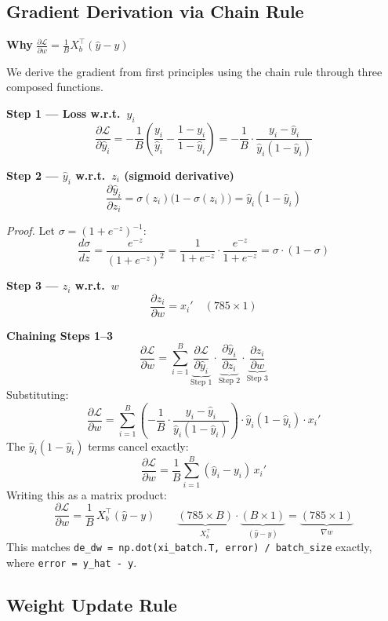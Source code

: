 \documentclass[11pt,a4paper]{article}
\begin{document}
\subsection{Gradient Derivation via Chain Rule}
\textbf{Why} $\displaystyle\frac{\partial \mathcal{L}}{\partial w} = \frac{1}{B} X_b^\top (\hat{y} - y)$

We derive the gradient from first principles using the chain rule through three composed functions.

\noindent\textbf{Step 1 — Loss w.r.t.\ $\hat{y}_i$}
\[
\frac{\partial \mathcal{L}}{\partial \hat{y}_i}
= -\frac{1}{B}\left(\frac{y_i}{\hat{y}_i} - \frac{1-y_i}{1-\hat{y}_i}\right)
= -\frac{1}{B} \cdot \frac{y_i - \hat{y}_i}{\hat{y}_i(1-\hat{y}_i)}
\]

\noindent\textbf{Step 2 — $\hat{y}_i$ w.r.t.\ $z_i$ (sigmoid derivative)}
\[
\frac{\partial \hat{y}_i}{\partial z_i} = \sigma(z_i)\bigl(1 - \sigma(z_i)\bigr) = \hat{y}_i(1 - \hat{y}_i)
\]

\textit{Proof.} Let $\sigma = (1+e^{-z})^{-1}$:
\[
\frac{d\sigma}{dz}
= \frac{e^{-z}}{(1+e^{-z})^2}
= \frac{1}{1+e^{-z}} \cdot \frac{e^{-z}}{1+e^{-z}}
= \sigma \cdot (1 - \sigma)
\]

\noindent\textbf{Step 3 — $z_i$ w.r.t.\ $w$}
\[
\frac{\partial z_i}{\partial w} = x_i' \quad (785 \times 1)
\]

\noindent\textbf{Chaining Steps 1--3}
\[
\frac{\partial \mathcal{L}}{\partial w}
= \sum_{i=1}^{B}
\underbrace{\frac{\partial \mathcal{L}}{\partial \hat{y}_i}}_{\text{Step 1}}
\cdot
\underbrace{\frac{\partial \hat{y}_i}{\partial z_i}}_{\text{Step 2}}
\cdot
\underbrace{\frac{\partial z_i}{\partial w}}_{\text{Step 3}}
\]
Substituting:
\[
\frac{\partial \mathcal{L}}{\partial w}
= \sum_{i=1}^{B}
\left(-\frac{1}{B} \cdot \frac{y_i - \hat{y}_i}{\hat{y}_i(1-\hat{y}_i)}\right)
\cdot \hat{y}_i(1-\hat{y}_i) \cdot x_i'
\]
The $\hat{y}_i(1-\hat{y}_i)$ terms cancel exactly:
\[
\frac{\partial \mathcal{L}}{\partial w}
= \frac{1}{B} \sum_{i=1}^{B} (\hat{y}_i - y_i)\, x_i'
\]
Writing this as a matrix product:
\[
\frac{\partial \mathcal{L}}{\partial w}
= \frac{1}{B}\, X_b^\top (\hat{y} - y)
\qquad
\underbrace{(785 \times B)}_{X_b^\top} \cdot \underbrace{(B \times 1)}_{(\hat{y}-y)} = \underbrace{(785 \times 1)}_{\nabla w}
\]
This matches \texttt{de\_dw = np.dot(xi\_batch.T, error) / batch\_size} exactly, where \texttt{error = y\_hat - y}.

\subsection{Weight Update Rule}
\end{document}
